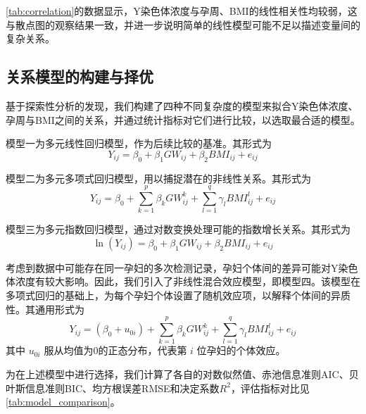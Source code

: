 \cref{tab:correlation}的数据显示，Y染色体浓度与孕周、BMI的线性相关性均较弱，这与散点图的观察结果一致，并进一步说明简单的线性模型可能不足以描述变量间的复杂关系。

\subsection{关系模型的构建与择优}
基于探索性分析的发现，我们构建了四种不同复杂度的模型来拟合Y染色体浓度、孕周与BMI之间的关系，并通过统计指标对它们进行比较，以选取最合适的模型。

模型一为多元线性回归模型，作为后续比较的基准。其形式为
\begin{equation}
Y_{ij} = \beta_0 + \beta_1 GW_{ij} + \beta_2 BMI_{ij} + e_{ij}
\end{equation}

模型二为多元多项式回归模型，用以捕捉潜在的非线性关系。其形式为
\begin{equation}
Y_{ij} = \beta_0 + \sum_{k=1}^p \beta_k GW_{ij}^k + \sum_{l=1}^q \gamma_l BMI_{ij}^l + e_{ij}
\end{equation}

模型三为多元指数回归模型，通过对数变换处理可能的指数增长关系。其形式为
\begin{equation}
\ln(Y_{ij}) = \beta_0 + \beta_1 GW_{ij} + \beta_2 BMI_{ij} + e_{ij}
\end{equation}

考虑到数据中可能存在同一孕妇的多次检测记录，孕妇个体间的差异可能对Y染色体浓度有较大影响。因此，我们引入了非线性混合效应模型，即模型四。该模型在多项式回归的基础上，为每个孕妇个体设置了随机效应项，以解释个体间的异质性。其通用形式为
\begin{equation}
Y_{ij} = (\beta_0 + u_{0i}) + \sum_{k=1}^p \beta_k GW_{ij}^k + \sum_{l=1}^q \gamma_l BMI_{ij}^l + e_{ij}
\end{equation}
其中 $u_{0i}$ 服从均值为0的正态分布，代表第 $i$ 位孕妇的个体效应。

为在上述模型中进行选择，我们计算了各自的对数似然值、赤池信息准则AIC、贝叶斯信息准则BIC、均方根误差RMSE和决定系数$R^2$，评估指标对比见\cref{tab:model_comparison}。

\begin{table}[h!]
\centering
\caption{四种候选模型的评估指标对比}
\label{tab:model_comparison}
\end{table}

